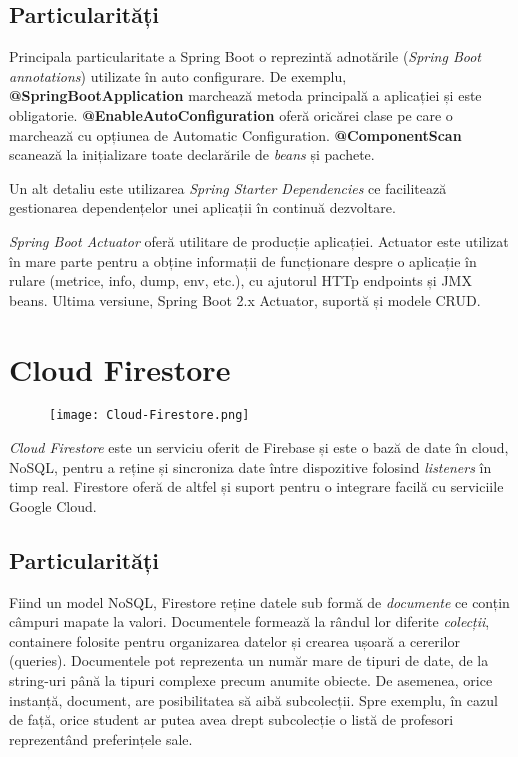 \subsection{Particularități}
Principala particularitate a Spring Boot o reprezintă adnotările (\textit{Spring Boot annotations}) utilizate în auto configurare.
De exemplu, \textbf{@SpringBootApplication} marchează metoda principală a aplicației și este obligatorie.
\textbf{@EnableAutoConfiguration} oferă oricărei clase pe care o marchează cu opțiunea de Automatic Configuration.
\textbf{@ComponentScan} scanează la inițializare toate declarările de \textit{beans} și pachete.

Un alt detaliu este utilizarea \textit{Spring Starter Dependencies} ce facilitează gestionarea dependențelor unei aplicații în continuă dezvoltare.

\textit{Spring Boot Actuator} oferă utilitare de producție aplicației. Actuator este utilizat în mare parte pentru a obține informații de funcționare despre o aplicație în rulare (metrice, info, dump, env, etc.), cu ajutorul HTTp endpoints și JMX beans.
Ultima versiune, Spring Boot 2.x Actuator, suportă și modele CRUD.

\section{Cloud Firestore}
\begin{figure}[H]
	\centering
	\texttt{[image: Cloud-Firestore.png]}
\end{figure}

\textit{Cloud Firestore} este un serviciu oferit de Firebase și este o bază de date în cloud, NoSQL, pentru a reține și sincroniza date între dispozitive folosind \textit{listeners} în timp real. Firestore oferă de altfel și suport pentru o integrare facilă cu serviciile Google Cloud.

\subsection{Particularități}
Fiind un model NoSQL, Firestore reține datele sub formă de \textit{documente} ce conțin câmpuri mapate la valori. Documentele formează la rândul lor diferite \textit{colecții}, containere folosite pentru organizarea datelor și crearea ușoară a cererilor (queries). Documentele pot reprezenta un număr mare de tipuri de date, de la string-uri până la tipuri complexe precum anumite obiecte. De asemenea, orice instanță, document, are posibilitatea să aibă subcolecții. Spre exemplu, în cazul de față, orice student ar putea avea drept subcolecție o listă de profesori reprezentând preferințele sale.

